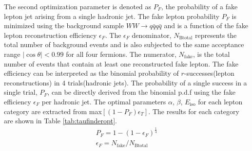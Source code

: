  The second optimization parameter is denoted as $P_F$, the probability of a fake lepton jet arising from a single hadronic jet. The fake lepton probability $P_F$ is minimized using the background sample $WW\rightarrow q\bar{q}q\bar{q}$ and is a function of the fake lepton reconstruction efficiency $\epsilon_F$. The $\epsilon_F$ denominator, $N_{\text{Btotal}}$ represents the total number of background events and is also subjected to the same acceptance range $|\cos\theta| < 0.99$ for all four fermions. The numerator, $N_{\text{fake}}$, is the total number of events  that contain at least one reconstructed fake lepton. The fake efficiency can be interpreted as the binomial probability of $r$-successes(lepton reconstructions) in 4 trials(hadronic jets). The probability of a single success in a single trial, $P_F$, can be directly derived from the binomial p.d.f using the fake efficiency $\epsilon_F$ per hadronic jet. The optimal parameters $\alpha$, $\beta$, $E_{\text{iso}}$ for each lepton category are extracted from max$[(1-P_F)\epsilon_T]$. The results for each category are shown in Table \ref{tab:taufinderopt}. 
\begin{equation}
\begin{split}
\label{eq:pf}
P_F = 1-(1-\epsilon_F)^{\frac{1}{4}} \\
\epsilon_F = N_{\text{fake}}/N_{\text{Btotal}}
\end{split}
\end{equation}

  


